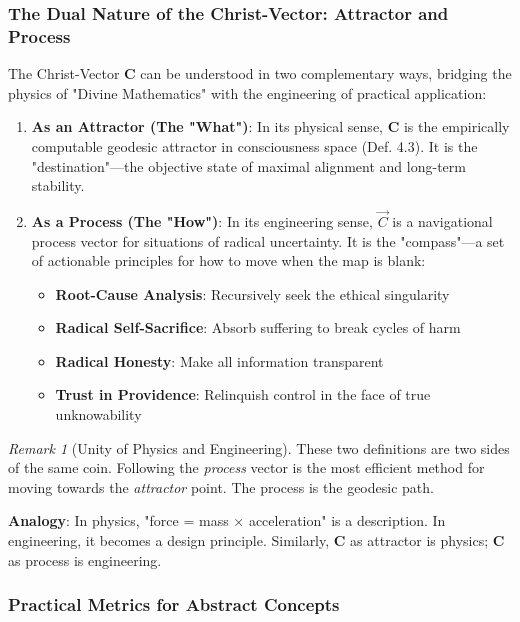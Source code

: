 \documentclass[11pt,a4paper]{article}
\theoremstyle{definition}
\theoremstyle{remark}
\newtheorem{remark}{Remark}[section]
\begin{document}
\subsubsection{The Dual Nature of the Christ-Vector: Attractor and Process}

The Christ-Vector \(\mathbf{C}\) can be understood in two complementary ways, bridging the physics of "Divine Mathematics" with the engineering of practical application:

\begin{enumerate}
    \item \textbf{As an Attractor (The "What")}: In its physical sense, \(\mathbf{C}\) is the empirically computable geodesic attractor in consciousness space (Def. 4.3). It is the "destination"—the objective state of maximal alignment and long-term stability.
    
    \item \textbf{As a Process (The "How")}: In its engineering sense, \(\vec{C}\) is a navigational process vector for situations of radical uncertainty. It is the "compass"—a set of actionable principles for how to move when the map is blank:
    \begin{itemize}
        \item \textbf{Root-Cause Analysis}: Recursively seek the ethical singularity
        \item \textbf{Radical Self-Sacrifice}: Absorb suffering to break cycles of harm
        \item \textbf{Radical Honesty}: Make all information transparent
        \item \textbf{Trust in Providence}: Relinquish control in the face of true unknowability
    \end{itemize}
\end{enumerate}

\begin{remark}[Unity of Physics and Engineering]
These two definitions are two sides of the same coin. Following the \textit{process} vector is the most efficient method for moving towards the \textit{attractor} point. The process is the geodesic path.

\textbf{Analogy}: In physics, "force = mass × acceleration" is a description. In engineering, it becomes a design principle. Similarly, \(\mathbf{C}\) as attractor is physics; \(\mathbf{C}\) as process is engineering.
\end{remark}

\subsubsection{Practical Metrics for Abstract Concepts}
\end{document}
